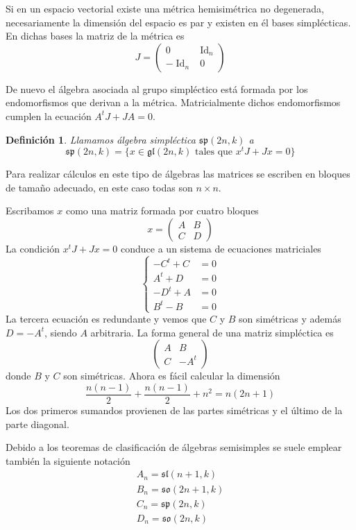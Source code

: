 \documentclass[a4paper,draft,12pt]{article}
\newtheorem{defi}{Definición}[section]%
\newcommand{\df}[1]{\textsf{\color{blue}#1}}
\DeclareMathOperator{\Id}{Id}%
\begin{document}
Si en un espacio vectorial existe una métrica hemisimétrica no degenerada, necesariamente la dimensión del espacio es par y existen en él bases simplécticas.  En dichas bases la matriz de la métrica es
$$
J=
\begin{pmatrix}
0 & \Id_n \\
-\Id_n& 0
\end{pmatrix}
$$

De nuevo el álgebra asociada al grupo simpléctico está formada por los endomorfismos que derivan a la métrica.  Matricialmente dichos endomorfismos cumplen la ecuación $A^tJ+JA=0$.

\begin{defi}

Llamamos  \df{álgebra simpléctica}  $\mathfrak{sp}(2n,k)$ a 
$$
 \mathfrak{sp}(2n,k)=\{x \in \mathfrak{gl}(2n,k) \text{ tales que }x^t J+Jx=0\}
$$

\end{defi}

Para realizar cálculos en este tipo de álgebras las matrices se escriben en bloques de tamaño adecuado, en este caso todas son $n \times n$.

Escribamos $x$ como una matriz formada por cuatro bloques
$$
x=\begin{pmatrix} A& B \\ C & D\end{pmatrix}
$$
La condición $x^tJ+Jx=0$ conduce a un sistema de ecuaciones matriciales
$$
\begin{cases} 
-C^t+C&=0 \\
A^t+D &=0 \\
-D^t+A &=0 \\
B^t-B&=0
\end{cases}
$$
La tercera ecuación es redundante y vemos que $C$ y $B$ son simétricas y además $D=-A^t$, siendo $A$ arbitraria. La forma general de una matriz simpléctica es
$$
\begin{pmatrix}
A & B \\
C & -A^t
\end{pmatrix}
$$
donde $B$ y $C$ son simétricas.  Ahora es fácil calcular la dimensión
$$
\frac{n(n-1)}{2}+\frac{n(n-1)}{2}+n^2=n(2n+1)
$$
Los dos primeros sumandos provienen de las partes simétricas y el último de la parte diagonal.

\bigskip



Debido a los teoremas de clasificación de álgebras semisimples se suele emplear también la siguiente notación
$$
\begin{array}{l}
A_n= \mathfrak{sl}(n+1,k) \\
B_n = \mathfrak{so} (2n+1,k) \\
C_n= \mathfrak{sp}(2n,k) \\
D_n= \mathfrak{so}(2n,k)
\end{array}
$$
\end{document}
